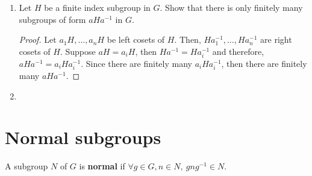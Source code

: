 \begin{enumerate}
\begin{proof}
        Therefore, \(Ha_i \cap Kb_j\) are either empty or a right coset of \(H \cap K\). Since there finitely many \(Ha_i \cap Kb_j\), there finitely many right cosets of \(H \cap K\) in \(G\). Moreover, \(\squareBracket{G:H \cap K} \leq \squareBracket{G:H} \squareBracket{G:K}\) by this construction. Note that, \(H \cap K\) is finite index in \(H\), and let \((H \cap K)c_1, \dots , (H \cap K)c_l\) be the right cosets of \(H \cap K\) in \(H\). We claim that \((H \cap K)c_ra_i\) are the right cosets of \(H \cap K\) in \(G\). By definition, for each \(x \in G\), there exists \(i\) such that \(x \in Ha_i\)and hence \(x = ha_i\) for some \(h \in H\). Similary, there exists \(r\) such that \(h \in (H \cap K)c_r\) and hence \(h = fc_r\) for some \(f \in H \cap K\). Therefore, \(x = fc_ra_i\) and \(x \in (H \cap K)c_ra_i\). Lastly, we must show that \((H \cap K)c_ra_i\) are disjoint. Consider \((H \cap K)  c_{r_1}a_{i_1}\) and \((H \cap K)c_{r_2}a_{i_2}\). Since \((H \cap K)c_{r_1}, (H \cap K)c_{r_2} \subset H\), then 
        \begin{align*}
            (H \cap K)c_{r_1}a_{i_1} = (H \cap K)  c_{r_2}a_{i_2} &\implies a_{i_1} = a_{i_2}, (H \cap K)  c_{r_1} = (H \cap K)  c_{r_2}\\
            &\implies a_{i_1} = a_{i_2}, c_{r_1} = c_{r_2}
        \end{align*}
        As a result, \(\squareBracket{G:H \cap K} = \squareBracket{G:H} \squareBracket{H:H\cap K}\).
        \end{proof}
    \item Let \(H\) be a finite index subgroup in \(G\). Show that there is only finitely many subgroups of form \(aHa^{-1}\) in \(G\).
    \begin{proof}
        Let \(a_1H, \dots, a_nH\) be left cosets of \(H\). Then, \(Ha_1^{-1}, \dots, Ha_n^{-1}\) are right cosets of \(H\). Suppose \(aH = a_iH\), then \(Ha^{-1} = Ha_i^{-1}\) and therefore, \(aHa^{-1} = a_{i} H a_{i}^{-1}\). Since there are finitely many \(a_i H a_i^{-1}\), then there are finitely many \(aHa^{-1}\).
    \end{proof}
    \item
\end{enumerate}
\section{Normal subgroups}
\begin{definition}
    A subgroup \(N\) of \(G\) is \textbf{normal} if \(\forall g \in G,n \in N,\ gng^{-1} \in N\).
\end{definition}

